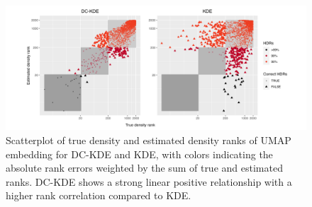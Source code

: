 \documentclass[11pt,a4paper,]{article}
\begin{document}
\begin{figure}

{\centering \includegraphics[width=1\linewidth]{figures/Twin Peak2000_densityrank_comparison_umap_radius8_r0_5_logrank_rec_colprob_smallblocks3_crossfalse} 

}

\caption{Scatterplot of true density and estimated density ranks of UMAP embedding for DC-KDE and KDE, with colors indicating the absolute rank errors weighted by the sum of true and estimated ranks. DC-KDE shows a strong linear positive relationship with a higher rank correlation compared to KDE.}\label{fig:tpumapden}
\end{figure}
\end{document}
